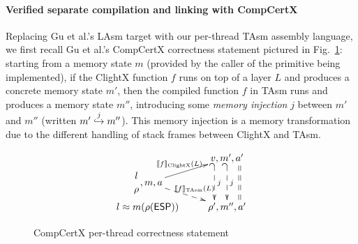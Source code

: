 \paragraph{Verified separate compilation and linking with CompCertX} 
Replacing Gu et al.'s LAsm target with our per-thread TAsm assembly
language, we first recall Gu et al.'s CompCertX correctness statement
pictured in Fig.~\ref{fig:compcertx}: starting from a memory state $m$
(provided by the caller of the primitive being implemented), if the
ClightX function $f$ runs on top of a layer $L$ and produces a
concrete memory state $m'$, then the compiled function $f$ in TAsm
runs and produces a memory state $m''$, introducing some \emph{memory
  injection} $j$ between $m'$ and $m''$ (written
$\inject{j}{m'}{m''}$). This memory injection is a memory
transformation \cite[\S 5.4]{leroy08} due to the different handling of
stack frames between ClightX and TAsm.


\begin{figure}
\[
\xymatrix@R=3pt@C+=3pt{
& v, m', a'
\ar@<-3ex>@{_{(}-->}[dd]^j
\ar@{_{(}-->}[dd]^j
\ar@<3ex>@{==}[dd]
\\
\genfrac{}{}{0pt}{0}{l}{\rho}, m, a
\ar[ur]^{\llbracket f \rrbracket_{\text{ClightX}}(L)}
\ar@{-->}[dr]^{ \llbracket f \rrbracket_{\text{TAsm}}(L)} \\
l \approx m(\rho(\textsf{ESP}))
& \rho', m'', a'
}
\]
\vspace{-10pt}
\caption{CompCertX per-thread correctness statement} \label{fig:compcertx}
\vspace{-10pt}
\end{figure}

